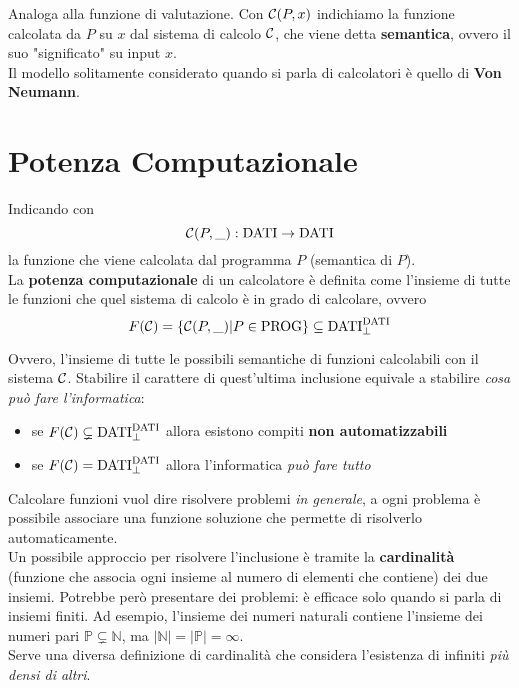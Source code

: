 Analoga alla funzione di valutazione. Con $\mathcal{C}(P,x)$ indichiamo la funzione calcolata da $P$ su $x$ dal sistema di calcolo $\mathcal{C}$, che viene detta \textbf{semantica}, ovvero il suo "significato" su input $x$.\\

Il modello solitamente considerato quando si parla di calcolatori è quello di \textbf{Von Neumann}.\\

\section{Potenza Computazionale}
Indicando con 
$$ \mathcal{C} (P, \_): \text{DATI} \rightarrow \text{DATI} $$
la funzione che viene calcolata dal programma $P$ (semantica di $P$).\\

La \textbf{potenza computazionale} di un calcolatore è definita come l'insieme di tutte le funzioni che quel sistema di calcolo è in grado di calcolare, ovvero
$$ F(\mathcal{C}) = \{\mathcal{C} (P, \_) | P \in \text{PROG}\} \subseteq \text{DATI}_\bot^{\text{DATI}} $$

Ovvero, l'insieme di tutte le possibili semantiche di funzioni calcolabili con il sistema $\mathcal{C}$. Stabilire il carattere di quest'ultima inclusione equivale a stabilire \textit{cosa può fare l'informatica}:
\begin{itemize}
	\item se $F(\mathcal{C}) \subsetneq \text{DATI}_\bot^{\text{DATI}}$ allora esistono compiti \textbf{non automatizzabili}
	\item se $F(\mathcal{C}) = \text{DATI}_\bot^{\text{DATI}}$ allora l'informatica \textit{può fare tutto}
\end{itemize}

Calcolare funzioni vuol dire risolvere problemi \textit{in generale}, a ogni problema è possibile associare una funzione soluzione che permette di risolverlo automaticamente.\\

Un possibile approccio per risolvere l'inclusione è tramite la \textbf{cardinalità} (funzione che associa ogni insieme al numero di elementi che contiene) dei due insiemi. Potrebbe però presentare dei problemi: è efficace solo quando si parla di insiemi finiti. Ad esempio, l'insieme dei numeri naturali contiene l'insieme dei numeri pari $\mathbb{P} \subsetneq \mathbb{N}$, ma $|\mathbb{N}| = |\mathbb{P}| = \infty$.\\
Serve una diversa definizione di cardinalità che considera l'esistenza di infiniti \textit{più densi di altri}.\\

